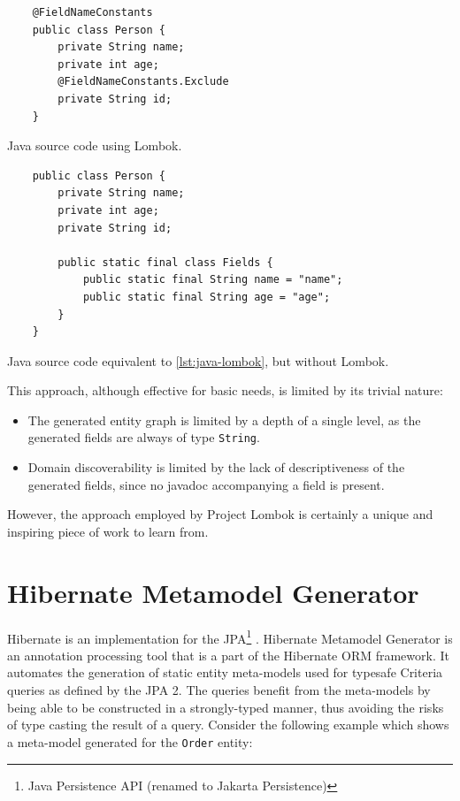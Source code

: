 \begin{listing}[H]
    \begin{verbatim}
    @FieldNameConstants
    public class Person {
        private String name;
        private int age;
        @FieldNameConstants.Exclude
        private String id;
    }
    \end{verbatim}
    \caption{Java source code using Lombok.}\label{lst:java-lombok}
\end{listing}

\begin{listing}[H]
    \begin{verbatim}
    public class Person {
        private String name;
        private int age;
        private String id;

        public static final class Fields {
            public static final String name = "name";
            public static final String age = "age";
        }
    }
    \end{verbatim}
    \caption{Java source code equivalent to \ref{lst:java-lombok}, but without Lombok.}
    \label{lst:java-no-lombok}
\end{listing}

This approach, although effective for basic needs, is limited by its trivial nature:
\begin{itemize}
    \item The generated entity graph is limited by a depth of a single level, as the generated fields are always of type \texttt{String}.
    \item Domain discoverability is limited by the lack of descriptiveness of the generated fields, since no javadoc accompanying a field is present.
\end{itemize}

However, the approach employed by Project Lombok is certainly a unique and inspiring piece of work to learn from.

\section{Hibernate Metamodel Generator}
Hibernate is an implementation for the JPA\footnote{Java Persistence API (renamed to Jakarta Persistence)} \cite{jpa}. Hibernate Metamodel Generator \cite{hmg} is an annotation processing tool that is a part of the Hibernate ORM framework.
It automates the generation of static entity meta-models used for typesafe Criteria queries as defined by the JPA 2.
The queries benefit from the meta-models by being able to be constructed in a strongly-typed manner, thus avoiding the risks of type casting the result of a query.
Consider the following example which shows a meta-model generated for the \texttt{Order} entity:

